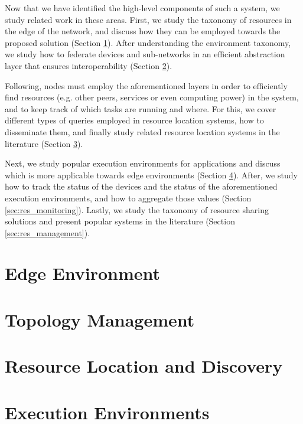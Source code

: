 Now that we have identified the high-level components of such a system, we study related work in these areas. First, we study the taxonomy of resources in the edge of the network, and discuss how they can be employed towards the proposed solution (Section \ref{sec:edge_computing}). After understanding the environment taxonomy, we study how to federate devices and sub-networks in an efficient abstraction layer that ensures interoperability (Section \ref{sec:topology_management}).

Following, nodes must employ the aforementioned layers in order to efficiently find resources (e.g. other peers, services or even computing power) in the system, and to keep track of which tasks are running and where. For this, we cover different types of queries employed in resource location systems, how to disseminate them, and finally study related resource location systems in the  literature (Section \ref{sec:res_location}).

Next, we study popular execution environments for applications and discuss which is more applicable towards edge environments (Section \ref{sec:runtime_environments}). After, we study how to track the status of the devices and the status of the aforementioned execution environments, and how to aggregate those values (Section \ref{sec:res_monitoring}).  Lastly, we study the taxonomy of resource sharing solutions and present popular systems in the literature (Section \ref{sec:res_management}). 

\section{Edge Environment} \label{sec:edge_computing} 

\section{Topology Management} \label{sec:topology_management} 

\section{Resource Location and Discovery} \label{sec:res_location} 

\section{Execution Environments} \label{sec:runtime_environments} 

